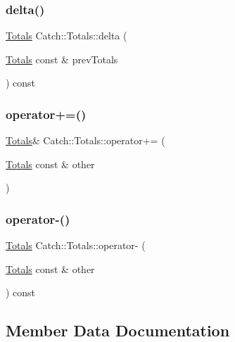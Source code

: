 \subsubsection{\texorpdfstring{delta()}{delta()}}
{\footnotesize\ttfamily \mbox{\hyperlink{structCatch_1_1Totals}{Totals}} Catch\+::\+Totals\+::delta (\begin{DoxyParamCaption}\item[{\mbox{\hyperlink{structCatch_1_1Totals}{Totals}} const \&}]{prev\+Totals }\end{DoxyParamCaption}) const}

\mbox{\label{structCatch_1_1Totals_a574015076e54cc405c70b053e3356e43}} 
\subsubsection{\texorpdfstring{operator+=()}{operator+=()}}
{\footnotesize\ttfamily \mbox{\hyperlink{structCatch_1_1Totals}{Totals}}\& Catch\+::\+Totals\+::operator+= (\begin{DoxyParamCaption}\item[{\mbox{\hyperlink{structCatch_1_1Totals}{Totals}} const \&}]{other }\end{DoxyParamCaption})}

\mbox{\label{structCatch_1_1Totals_a9279ed39139cb7e7b291918a6d08290e}} 
\subsubsection{\texorpdfstring{operator-\/()}{operator-()}}
{\footnotesize\ttfamily \mbox{\hyperlink{structCatch_1_1Totals}{Totals}} Catch\+::\+Totals\+::operator-\/ (\begin{DoxyParamCaption}\item[{\mbox{\hyperlink{structCatch_1_1Totals}{Totals}} const \&}]{other }\end{DoxyParamCaption}) const}



\subsection{Member Data Documentation}
\mbox{\label{structCatch_1_1Totals_a885ded66df752147b30c3d45aa602ec9}} 
